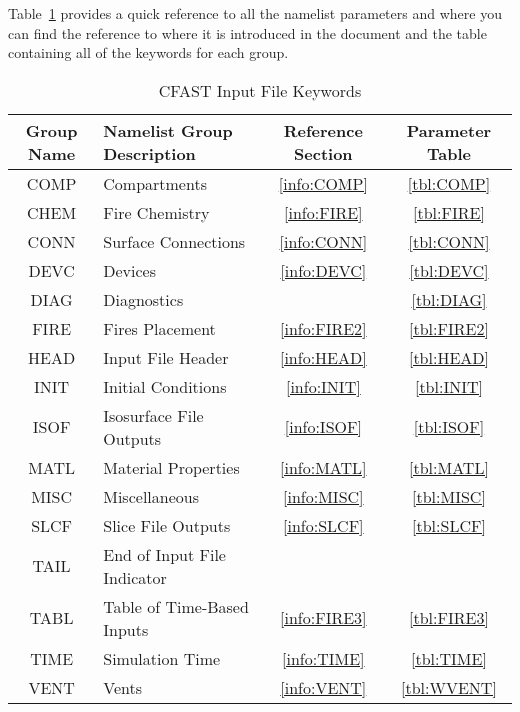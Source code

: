 Table~\ref{tbl:namelistgroups} provides a quick reference to all the namelist parameters and where you can find the reference to where it is introduced in the document and the table containing all of the keywords for each group.


\begin{table}[ht]
\begin{center}
\caption{CFAST Input File Keywords}
\label{tbl:namelistgroups}
\begin{tabular}{|c|l|c|c|}
\hline
Group Name   & Namelist Group Description     & Reference Section & Parameter Table  \\ \hline
{\ct COMP}   & Compartments                   & \ref{info:COMP}   & \ref{tbl:COMP}   \\ \hline
{\ct CHEM}   & Fire Chemistry                 & \ref{info:FIRE}   & \ref{tbl:FIRE}   \\ \hline
{\ct CONN}   & Surface Connections            & \ref{info:CONN}   & \ref{tbl:CONN}   \\ \hline
{\ct DEVC}   & Devices                        & \ref{info:DEVC}   & \ref{tbl:DEVC}   \\ \hline
{\ct DIAG}   & Diagnostics                    &                   & \ref{tbl:DIAG}   \\ \hline
{\ct FIRE}   & Fires Placement                & \ref{info:FIRE2}  & \ref{tbl:FIRE2}  \\ \hline
{\ct HEAD}   & Input File Header              & \ref{info:HEAD}   & \ref{tbl:HEAD}   \\ \hline
{\ct INIT}   & Initial Conditions             & \ref{info:INIT}   & \ref{tbl:INIT}   \\ \hline
{\ct ISOF}   & Isosurface File Outputs        & \ref{info:ISOF}   & \ref{tbl:ISOF}   \\ \hline
{\ct MATL}   & Material Properties            & \ref{info:MATL}   & \ref{tbl:MATL}   \\ \hline
{\ct MISC}   & Miscellaneous                  & \ref{info:MISC}   & \ref{tbl:MISC}   \\ \hline
{\ct SLCF}   & Slice File Outputs             & \ref{info:SLCF}   & \ref{tbl:SLCF}   \\ \hline
{\ct TAIL}   & End of Input File Indicator    &                   &                  \\ \hline
{\ct TABL}   & Table of Time-Based Inputs     & \ref{info:FIRE3}  & \ref{tbl:FIRE3}  \\ \hline
{\ct TIME}   & Simulation Time                & \ref{info:TIME}   & \ref{tbl:TIME}   \\ \hline
{\ct VENT}   & Vents                          & \ref{info:VENT}   & \ref{tbl:WVENT}  \\ \hline
\end{tabular}
\end{center}
\end{table}

